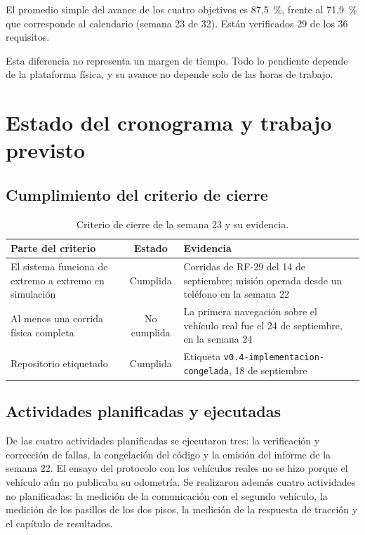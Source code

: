 \documentclass[12pt,letterpaper]{article}
\begin{document}
El promedio simple del avance de los cuatro objetivos es 87,5~\%, frente al 71,9~\% que corresponde al calendario (semana 23 de 32). Están verificados 29 de los 36 requisitos.

Esta diferencia no representa un margen de tiempo. Todo lo pendiente depende de la plataforma física, y su avance no depende solo de las horas de trabajo.

\section{Estado del cronograma y trabajo previsto}
\label{sec:cronograma}

\subsection{Cumplimiento del criterio de cierre}

\begin{table}[H]
    \centering
    \small
    \caption{Criterio de cierre de la semana 23 y su evidencia.}
    \label{tab:cierre}
    \begin{tabular}{@{}p{5.4cm}cp{6.4cm}@{}}
        \toprule
        \textbf{Parte del criterio} & \textbf{Estado} & \textbf{Evidencia} \\ \midrule
        El sistema funciona de extremo a extremo en simulación & Cumplida & Corridas de RF-29 del 14 de septiembre; misión operada desde un teléfono en la semana 22 \\ \addlinespace
        Al menos una corrida física completa & No cumplida & La primera navegación sobre el vehículo real fue el 24 de septiembre, en la semana 24 \\ \addlinespace
        Repositorio etiquetado & Cumplida & Etiqueta \texttt{v0.4-implementacion-congelada}, 18 de septiembre \\ \bottomrule
    \end{tabular}
\end{table}

\subsection{Actividades planificadas y ejecutadas}

De las cuatro actividades planificadas se ejecutaron tres: la verificación y corrección de fallas, la congelación del código y la emisión del informe de la semana 22. El ensayo del protocolo con los vehículos reales no se hizo porque el vehículo aún no publicaba su odometría. Se realizaron además cuatro actividades no planificadas: la medición de la comunicación con el segundo vehículo, la medición de los pasillos de los dos pisos, la medición de la respuesta de tracción y el capítulo de resultados.
\end{document}
